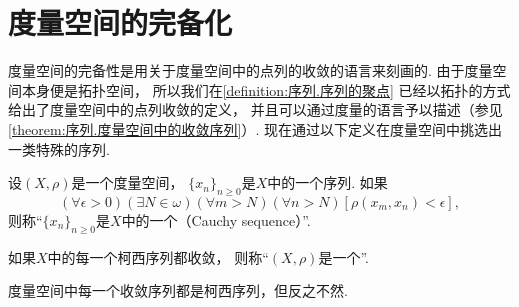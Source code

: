 \section{度量空间的完备化}
度量空间的完备性是用关于度量空间中的点列的收敛的语言来刻画的.
由于度量空间本身便是拓扑空间，
所以我们在\cref{definition:序列.序列的聚点}
已经以拓扑的方式给出了度量空间中的点列收敛的定义，
并且可以通过度量的语言予以描述（参见\cref{theorem:序列.度量空间中的收敛序列}）.
现在通过以下定义在度量空间中挑选出一类特殊的序列.

\begin{definition}\label{definition:度量空间的完备化.度量空间中的柯西序列}
设\((X,\rho)\)是一个度量空间，
\(\{x_n\}_{n\geq0}\)是\(X\)中的一个序列.
如果\[
	(\forall\epsilon>0)
	(\exists N\in\omega)
	(\forall m>N)
	(\forall n>N)
	[\rho(x_m,x_n)<\epsilon],
\]
则称“\(\{x_n\}_{n\geq0}\)是\(X\)中的一个（Cauchy sequence）”.

如果\(X\)中的每一个柯西序列都收敛，
则称“\((X,\rho)\)是一个”.
\end{definition}

\begin{proposition}
度量空间中每一个收敛序列都是柯西序列，但反之不然.
\end{proposition}
